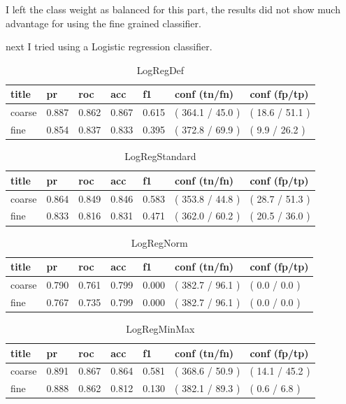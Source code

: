 \documentclass[ms]{nuthesis}
\begin{document}
\par I left the class weight as balanced for this part, the results did not show much advantage
for using the fine grained classifier.
\par next I tried using a Logistic regression classifier.



\FloatBarrier
\begin{table}[h]
\centering
\begin{tabular}{|l||l||l||l||l||l||l|}\toprule
title & pr & roc & acc & f1 & conf (tn/fn) & conf (fp/tp) \\ \midrule
coarse & 0.887 & 0.862 & 0.867 & 0.615 & ( 364.1 / 45.0 ) & ( 18.6 / 51.1 ) \\
fine & 0.854 & 0.837 & 0.833 & 0.395 & ( 372.8 / 69.9 ) & ( 9.9 / 26.2 ) \\ \bottomrule
\end{tabular}
\caption{LogRegDef}
\label{tab:LogRegDef}
\end{table}
\FloatBarrier

\FloatBarrier
\begin{table}[h]
\centering
\begin{tabular}{|l||l||l||l||l||l||l|}\toprule
title & pr & roc & acc & f1 & conf (tn/fn) & conf (fp/tp) \\ \midrule
coarse & 0.864 & 0.849 & 0.846 & 0.583 & ( 353.8 / 44.8 ) & ( 28.7 / 51.3 ) \\
fine & 0.833 & 0.816 & 0.831 & 0.471 & ( 362.0 / 60.2 ) & ( 20.5 / 36.0 ) \\ \bottomrule
\end{tabular}
\caption{LogRegStandard}
\label{tab:LogRegStandard}
\end{table}
\FloatBarrier

\FloatBarrier
\begin{table}[h]
\centering
\begin{tabular}{|l||l||l||l||l||l||l|}\toprule
title & pr & roc & acc & f1 & conf (tn/fn) & conf (fp/tp) \\ \midrule
coarse & 0.790 & 0.761 & 0.799 & 0.000 & ( 382.7 / 96.1 ) & ( 0.0 / 0.0 ) \\
fine & 0.767 & 0.735 & 0.799 & 0.000 & ( 382.7 / 96.1 ) & ( 0.0 / 0.0 ) \\ \bottomrule
\end{tabular}
\caption{LogRegNorm}
\label{tab:LogRegNorm}
\end{table}
\FloatBarrier

\FloatBarrier
\begin{table}[h]
\centering
\begin{tabular}{|l||l||l||l||l||l||l|}\toprule
title & pr & roc & acc & f1 & conf (tn/fn) & conf (fp/tp) \\ \midrule
coarse & 0.891 & 0.867 & 0.864 & 0.581 & ( 368.6 / 50.9 ) & ( 14.1 / 45.2 ) \\
fine & 0.888 & 0.862 & 0.812 & 0.130 & ( 382.1 / 89.3 ) & ( 0.6 / 6.8 ) \\ \bottomrule
\end{tabular}
\caption{LogRegMinMax}
\label{tab:LogRegMinMax}
\end{table}
\FloatBarrier
\end{document}
